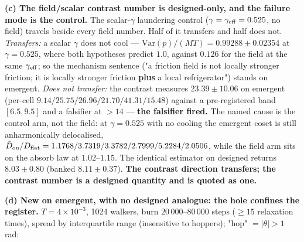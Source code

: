 \documentclass{article}
\begin{document}
\textbf{(c) The field/scalar contrast number is designed-only, and the failure mode is the control.} The scalar-$\gamma$ laundering control ($\gamma=\gamma_{\rm eff}=0.525$, no field) travels beside every field number. Half of it transfers and half does not. \emph{Transfers:} a scalar $\gamma$ does not cool --- $\mathrm{Var}(p)/(M T)=0.99288\pm0.02354$ at $\gamma=0.525$, where both hypotheses predict $1.0$, against $0.126$ for the field at the same $\gamma_{\rm eff}$; so the mechanism sentence ("a friction field is not locally stronger friction; it is locally stronger friction \textbf{plus} a local refrigerator") stands on emergent. \emph{Does not transfer:} the contrast measures $23.39\pm10.06$ on emergent (per-cell $9.14/25.75/26.96/21.70/41.31/15.48$) against a pre-registered band $[6.5,9.5]$ and a falsifier at $>14$ --- \textbf{the falsifier fired.} The named cause is the control arm, not the field: at $\gamma=0.525$ with no cooling the emergent coset is still anharmonically delocalised, $\hat D_{\rm ou}/D_{\rm flat}=1.1768/3.7319/3.3782/2.7999/5.2284/2.0506$, while the field arm sits on the absorb law at $1.02$--$1.15$. The identical estimator on designed returns $8.03\pm0.80$ (banked $8.11\pm0.37$). \textbf{The contrast direction transfers; the contrast number is a designed quantity and is quoted as one.}

\textbf{(d) New on emergent, with no designed analogue: the hole confines the register.} $T=4\times10^{-3}$, 1024 walkers, burn $20\,000$--$80\,000$ steps ($\ge15$ relaxation times), spread by interquartile range (insensitive to hoppers); "hop" $=|\theta|>1$ rad:
\end{document}
